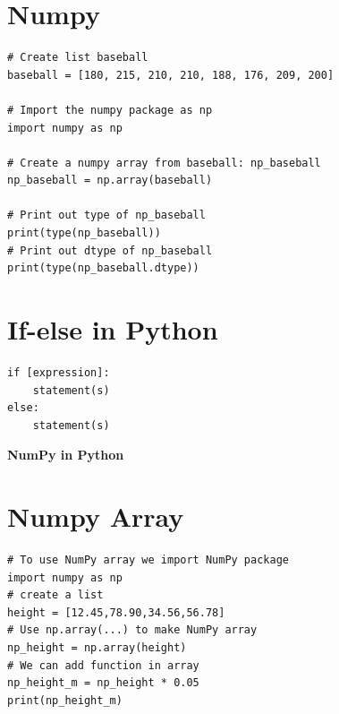\documentclass[12pt]{article}
\begin{document}
\section{Numpy}
\begin{lstlisting}
# Create list baseball
baseball = [180, 215, 210, 210, 188, 176, 209, 200]

# Import the numpy package as np
import numpy as np

# Create a numpy array from baseball: np_baseball
np_baseball = np.array(baseball)

# Print out type of np_baseball
print(type(np_baseball))
# Print out dtype of np_baseball
print(type(np_baseball.dtype))
\end{lstlisting}
\bigbreak
\section{If-else in Python}
\begin{lstlisting}
if [expression]:
	statement(s)
else:
	statement(s)
\end{lstlisting}
\pagebreak
\begin{center}
\textbf{NumPy in Python}
\end{center}
\section{Numpy Array}
\begin{lstlisting}
# To use NumPy array we import NumPy package
import numpy as np
# create a list
height = [12.45,78.90,34.56,56.78]
# Use np.array(...) to make NumPy array
np_height = np.array(height)
# We can add function in array
np_height_m = np_height * 0.05
print(np_height_m)
\end{lstlisting}
\end{document}
